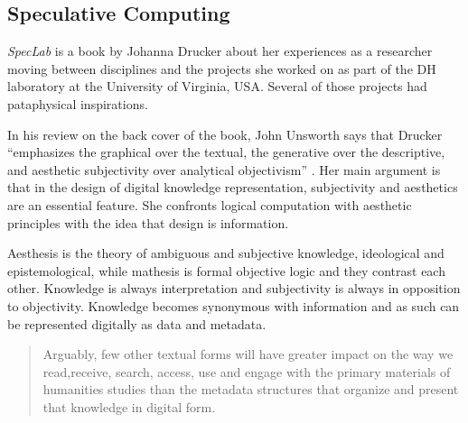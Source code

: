 


\subsection{Speculative Computing}
\label{s:speccomp}

\textit{SpecLab} is a book by Johanna Drucker \autocite*{Drucker2009} about her experiences as a researcher moving between disciplines and the projects she worked on as part of the \ac{DH} laboratory at the University of Virginia, USA\@. Several of those projects had pataphysical inspirations.

In his review on the back cover of the book, John Unsworth says that Drucker ``emphasizes the graphical over the textual, the generative over the descriptive, and aesthetic subjectivity over analytical objectivism'' \autocite*{Drucker2009}. Her main argument is that in the design of digital knowledge representation, subjectivity and aesthetics are an essential feature. She confronts logical computation with aesthetic principles with the idea that design is information.

Aesthesis is the theory of ambiguous and subjective knowledge, ideological and epistemological, while mathesis is formal objective logic and they contrast each other. Knowledge is always interpretation and subjectivity is always in opposition to objectivity. Knowledge becomes synonymous with information and as such can be represented digitally as data and metadata.

\begin{quotation}
  Arguably, few other textual forms will have greater impact on the way we read,receive, search, access, use and engage with the primary materials of humanities studies than the metadata structures that organize and present that knowledge in digital form. 
\end{quotation}

